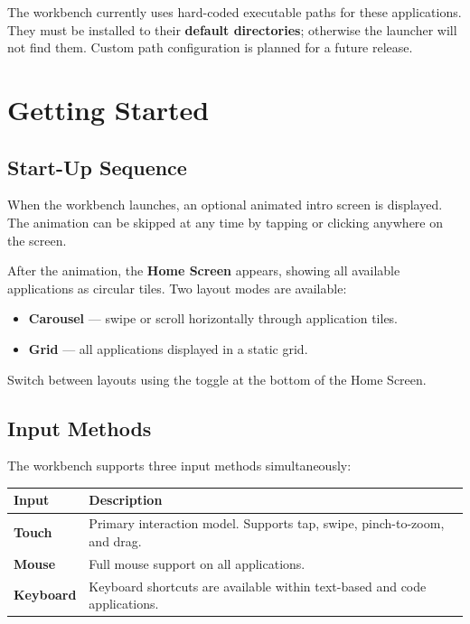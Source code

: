\documentclass[a4paper,12pt]{article}
\begin{document}
\begin{warnbox}
The workbench currently uses hard-coded executable paths for these applications. They must be installed to their \textbf{default directories}; otherwise the launcher will not find them. Custom path configuration is planned for a future release.
\end{warnbox}
 
\newpage
\section{Getting Started}
 
\subsection{Start-Up Sequence}
 
When the workbench launches, an optional animated intro screen is displayed. The animation can be skipped at any time by tapping or clicking anywhere on the screen.
 
After the animation, the \textbf{Home Screen} appears, showing all available applications as circular tiles. Two layout modes are available:
 
\begin{itemize}[leftmargin=1.5em]
    \item \textbf{Carousel} — swipe or scroll horizontally through application tiles.
    \item \textbf{Grid} — all applications displayed in a static grid.
\end{itemize}
 
Switch between layouts using the toggle at the bottom of the Home Screen.
 
\subsection{Input Methods}
 
The workbench supports three input methods simultaneously:
 
\begin{center}
\begin{tabular}{>{\bfseries}p{3cm} p{9cm}}
\toprule
Input & Description \\
\midrule
Touch       & Primary interaction model. Supports tap, swipe, pinch-to-zoom, and drag. \\
Mouse       & Full mouse support on all applications. \\
Keyboard    & Keyboard shortcuts are available within text-based and code applications. \\
\bottomrule
\end{tabular}
\end{center}
 
\end{document}
